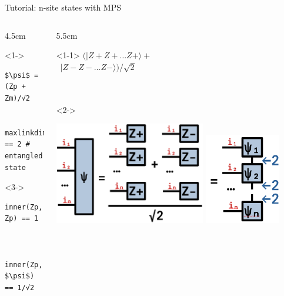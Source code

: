 \begin{frame}[fragile]{Tutorial: n-site states with MPS}

\begin{columns}

\begin{column}{4.5cm}

\begin{onlyenv}<1->
\begin{lstlisting}[language=JuliaLocal, style=julia, mathescape, basicstyle=\small]
$\psi$ = (Zp + Zm)/√2


maxlinkdim($\psi$) == 2 # entangled state
\end{lstlisting}
\end{onlyenv}

\begin{onlyenv}<3->
~\\
\begin{lstlisting}[language=JuliaLocal, style=julia, mathescape, basicstyle=\small]
  inner(Zp, Zp) == 1


  inner(Zp, $\psi$) == 1/√2
\end{lstlisting}
\end{onlyenv}

\end{column}

\begin{column}{5.5cm}

\begin{onlyenv}<1-1>
$(|Z+Z+\dots Z+\rangle +$ \\
\  $|Z-Z-\dots Z-\rangle)/\sqrt{2}$ \\
~\\
~\\
\end{onlyenv}

\begin{onlyenv}<2->
\begin{center}
\includegraphics[width=0.6\textwidth]{
  slides/assets/catn.png
}
\includegraphics[width=0.3\textwidth]{
  slides/assets/catn_mps.png
}
\end{center}
\end{onlyenv}


\end{column}
\end{columns}
\end{frame}
